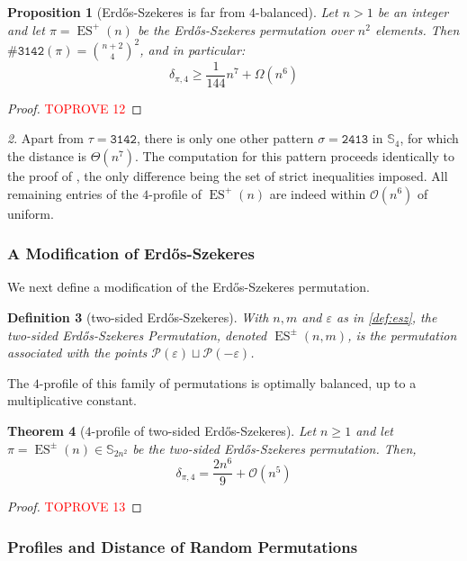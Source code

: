 \documentclass{article}
\newtheorem{theorem}{Theorem}[section]
\newtheorem{proposition}[theorem]{Proposition}
\newtheorem{definition}[theorem]{Definition}
\newcommand{\pc}[2]{{\# \mathtt{ #1 } \left( #2 \right)}}
\DeclareMathOperator{\ES}{ES}
\newcommand{\ESZ}{Erd\H{o}s-Szekeres\xspace}
\theoremstyle{remark}
\newtheorem{rem}[theorem]{\protect\remarkname}
\providecommand{\remarkname}{Remark}
\theoremstyle{plain}
\begin{document}
\begin{proposition} [\ESZ is far from $4$-balanced]
    \label{prop:distance_es_basic}
    Let $n > 1$ be an integer and let $\pi = \ES^+(n)$ be the \ESZ permutation over $n^2$ elements. Then $\pc{3142}{\pi} = \binom{n+2}{4}^2$, and in particular:
    \[
         \delta_{\pi, 4} \ge \frac{1}{144} n^{7} + \Omega(n^6)  
    \]
\end{proposition}
\begin{proof}\textcolor{red}{TOPROVE 12}\end{proof}

\begin{rem}
    Apart from $\tau = \mathtt{3142}$, there is only one other pattern $\sigma = \mathtt{2413}$ in $\mathbb{S}_4$, for which the distance is $\Theta(n^7)$. The computation for this pattern proceeds identically to the proof of , the only difference being the set of strict inequalities imposed. All remaining entries of the $4$-profile of $\ES^+(n)$ are indeed within $\mathcal{O}(n^6)$ of uniform.
\end{rem}

\subsubsection{A Modification of \ESZ}
\label{subsect:es_mod}

We next define a modification of the \ESZ permutation.

\begin{definition} [two-sided \ESZ]
        With $n,m$ and $\varepsilon$ as in \cref{def:esz}, the two-sided \ESZ Permutation, denoted $\ES^\pm(n,m)$, is the permutation associated with the points $\mathcal{P}(\varepsilon) \sqcup \mathcal{P}(-\varepsilon)$.
\end{definition}

The $4$-profile of this family of permutations is optimally balanced, up to a multiplicative constant.

\begin{theorem} [$4$-profile of two-sided \ESZ]
    \label{thm:prof_mod_es}
    Let $n \ge 1$ and let $\pi = \ES^{\pm}(n) \in \mathbb{S}_{2n^2}$ be the two-sided \ESZ permutation. Then, 
    \[
        \delta_{\pi, 4} = \frac{2n^6}{9} + \mathcal{O}(n^5)
    \]
\end{theorem}
\begin{proof}\textcolor{red}{TOPROVE 13}\end{proof}

\subsubsection{Profiles and Distance of Random Permutations}
\label{subsubsect:random_perms}
\end{document}
